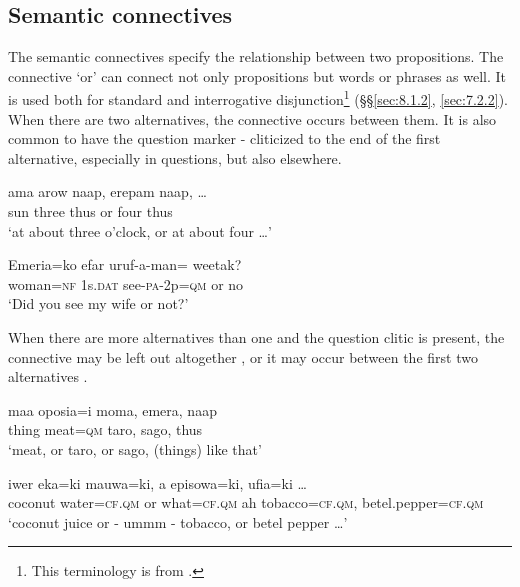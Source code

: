 \subsection{Semantic connectives}\label{sec:3.11.2}
{}
The semantic connectives specify the relationship between two propositions. The  connective  `or' can connect not only propositions but words or phrases as well. It is used both for standard  and interrogative  disjunction\footnote{This terminology is from \citet{Haspelmath2007}.} (§§\ref{sec:8.1.2}, \ref{sec:7.2.2}). When there are two alternatives, the connective occurs between them. It is also common to have the question marker - cliticized to the end of the first alternative, especially in questions, but also elsewhere.

\ea%
\label{ex:3:x724}
\gll ama arow naap,  erepam naap, {\dots} \\
sun three thus or four thus \\
\glt`at about three o'clock, or at about four {\dots}'
\z

\ea%
\label{ex:3:x725}
\gll Emeria=ko efar uruf-a-man=  weetak? \\
woman=\textsc{nf} 1s.\textsc{dat} see-\textsc{pa}-2p=\textsc{qm} or no\\
\glt`Did you see my wife or not?'
\z

When there are more alternatives than one and the question clitic is present, the connective may be left out altogether , or it may occur between the first two alternatives . 

\ea%
\label{ex:3:x726}
\gll maa oposia=i moma, emera, naap \\
thing meat=\textsc{qm} taro, sago, thus\\
\glt`meat, or taro, or sago, (things) like that'
\z

\ea%
\label{ex:3:x727}
\gll iwer eka=ki  mauwa=ki, a episowa=ki, ufia=ki {\dots}\\
coconut water=\textsc{cf}.\textsc{qm} or what=\textsc{cf}.\textsc{qm} ah tobacco=\textsc{cf}.\textsc{qm}, betel.pepper=\textsc{cf}.\textsc{qm}\\
\glt`coconut juice or - ummm - tobacco, or betel pepper {\dots}'
\z

